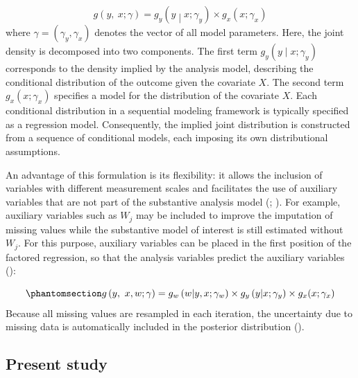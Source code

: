 \documentclass[
  letterpaper,
  11pt,
  english,
  singlespacing,
  headsepline,
  openany]{MastersDoctoralThesis}
\begin{document}
\[ 
g\left(y,\ x;\gamma\right)=g_y\left(y \middle| x;\gamma_y\right) \times g_x(x;\gamma_x)
\] where \(\gamma = (\gamma_y, \gamma_x)\) denotes the vector of all
model parameters. Here, the joint density is decomposed into two
components. The first term \(g_y(y \mid x; \gamma_y)\) corresponds to
the density implied by the analysis model, describing the conditional
distribution of the outcome given the covariate \(X\). The second term
\(g_x(x; \gamma_x)\) specifies a model for the distribution of the
covariate \(X\). Each conditional distribution in a sequential modeling
framework is typically specified as a regression model. Consequently,
the implied joint distribution is constructed from a sequence of
conditional models, each imposing its own distributional assumptions.

An advantage of this formulation is its flexibility: it allows the
inclusion of variables with different measurement scales and facilitates
the use of auxiliary variables that are not part of the substantive
analysis model (;
). For example, auxiliary
variables such as \(W_j\) may be included to improve the imputation of
missing values while the substantive model of interest is still
estimated without \(W_j\). For this purpose, auxiliary variables can be
placed in the first position of the factored regression, so that the
analysis variables predict the auxiliary variables
():

\begin{equation}\phantomsection\label{eq-frs}{ 
g\left(y,\ x,w;\gamma\right)=g_w\left(w\middle| y,x;\gamma_w\right) \times g_y\left(y\middle| x;\gamma_y\right) \times g_x(x;\gamma_x)
}\end{equation} Because all missing values are resampled in each
iteration, the uncertainty due to missing data is automatically included
in the posterior distribution ().

\subsection{Present study}\label{present-study}
\end{document}

